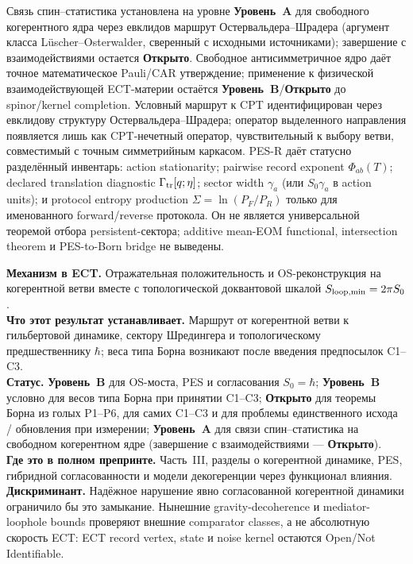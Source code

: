 \documentclass[11pt,a4paper]{article}
\newcommand{\statA}{\textbf{Уровень~A}}
\newcommand{\statB}{\textbf{Уровень~B}}
\newcommand{\statO}{\textbf{Открыто}}
\begin{document}
Связь спин--статистика установлена на уровне \statA{} для
свободного когерентного ядра через евклидов маршрут
Остервальдера--Шрадера (аргумент класса
L\"uscher--Osterwalder, сверенный с исходными источниками);
завершение с взаимодействиями остается \statO.
Свободное антисимметричное ядро даёт точное математическое Pauli/CAR
утверждение; применение к физической взаимодействующей ECT-материи
остаётся \statB{}/\statO{} до spinor/kernel completion.
Условный маршрут к CPT идентифицирован через евклидову структуру
Остервальдера--Шрадера; оператор выделенного направления
появляется лишь как CPT-нечетный оператор, чувствительный к
выбору ветви,
совместимый с точным симметрийным каркасом.
PES-R даёт статусно разделённый инвентарь: action stationarity; pairwise
record exponent $\Phi_{ab}(T)$; declared translation diagnostic
$\Gamma_{\rm tr}[q;\eta]$; sector width $\gamma_a$ (или
$S_0\gamma_a$ в action units); и protocol entropy production
$\Sigma=\ln(P_F/P_R)$ только для именованного forward/reverse
протокола. Он не является универсальной теоремой отбора
persistent-сектора; additive mean-EOM functional, intersection theorem
и PES-to-Born bridge не выведены.

\begin{mechbox}
\textbf{Механизм в ECT.}
Отражательная положительность и OS-реконструкция на когерентной
ветви вместе с топологической доквантовой шкалой
$S_{\rm loop,min}=2\pi S_0$.\\
\textbf{Что этот результат устанавливает.} Маршрут от
когерентной ветви к гильбертовой динамике, сектору Шредингера и
топологическому предшественнику $\hbar$; веса типа Борна
возникают после введения предпосылок C1--C3.\\
\textbf{Статус.} \statB{} для OS-моста, PES и согласования
$S_0=\hbar$; \statB{} условно для весов типа Борна при принятии
C1--C3; \statO{} для теоремы Борна из голых P1--P6, для самих
C1--C3 и для проблемы единственного исхода / обновления при
измерении; \statA{} для связи спин--статистика на свободном
когерентном ядре (завершение с взаимодействиями — \statO).\\
\textbf{Где это в полном препринте.} Часть~III, разделы о
когерентной динамике, PES, гибридной согласованности и модели
декогеренции через функционал влияния.\\
\textbf{Дискриминант.} Надёжное нарушение явно согласованной
когерентной динамики ограничило бы это замыкание. Нынешние
gravity-decoherence и mediator-loophole bounds проверяют внешние
comparator classes, а не абсолютную скорость ECT: ECT record vertex,
state и noise kernel остаются Open/Not Identifiable.
\end{mechbox}
\end{document}
